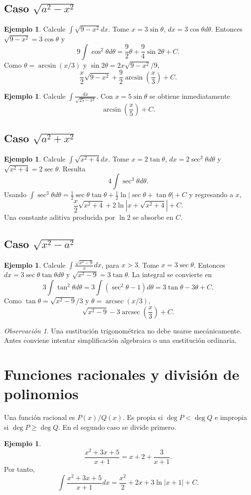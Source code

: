\documentclass[12pt]{article}
\theoremstyle{definition}\newtheorem{definicion}[teorema]{Definición}\newtheorem{ejemplo}[teorema]{Ejemplo}\newtheorem{ejercicio}[teorema]{Ejercicio}
\theoremstyle{remark}\newtheorem*{observacion}{Observación}\newtheorem*{advertencia}{Advertencia}\newtheorem*{estrategia}{Estrategia}
\begin{document}
\subsection{Caso $\sqrt{a^2-x^2}$}
\begin{ejemplo}Calcule $\int\sqrt{9-x^2}dx$. Tome $x=3\sin\theta$, $dx=3\cos\theta d\theta$. Entonces $\sqrt{9-x^2}=3\cos\theta$ y
\[9\int\cos^2\theta d\theta=\frac92\theta+\frac94\sin2\theta+C.\]
Como $\theta=\arcsin(x/3)$ y $\sin2\theta=2x\sqrt{9-x^2}/9$,
\[\boxed{\frac{x}{2}\sqrt{9-x^2}+\frac92\arcsin\left(\frac{x}{3}\right)+C}.\]\end{ejemplo}
\begin{ejemplo}Calcule $\int\frac{dx}{\sqrt{25-x^2}}$. Con $x=5\sin\theta$ se obtiene inmediatamente
\[\boxed{\arcsin\left(\frac{x}{5}\right)+C}.\]\end{ejemplo}
\subsection{Caso $\sqrt{a^2+x^2}$}
\begin{ejemplo}Calcule $\int\sqrt{x^2+4}dx$. Tome $x=2\tan\theta$, $dx=2\sec^2\theta d\theta$ y $\sqrt{x^2+4}=2\sec\theta$. Resulta
\[4\int\sec^3\theta d\theta.\]
Usando $\int\sec^3\theta d\theta=\frac12\sec\theta\tan\theta+\frac12\ln|\sec\theta+\tan\theta|+C$ y regresando a $x$,
\[\boxed{\frac{x}{2}\sqrt{x^2+4}+2\ln|x+\sqrt{x^2+4}|+C}.\]
Una constante aditiva producida por $\ln2$ se absorbe en $C$.\end{ejemplo}
\subsection{Caso $\sqrt{x^2-a^2}$}
\begin{ejemplo}Calcule $\int\frac{\sqrt{x^2-9}}{x}dx$, para $x>3$. Tome $x=3\sec\theta$. Entonces $dx=3\sec\theta\tan\theta d\theta$ y $\sqrt{x^2-9}=3\tan\theta$. La integral se convierte en
\[3\int\tan^2\theta d\theta=3\int(\sec^2\theta-1)d\theta=3\tan\theta-3\theta+C.\]
Como $\tan\theta=\sqrt{x^2-9}/3$ y $\theta=\operatorname{arcsec}(x/3)$,
\[\boxed{\sqrt{x^2-9}-3\operatorname{arcsec}\left(\frac{x}{3}\right)+C}.\]\end{ejemplo}
\begin{observacion}Una sustitución trigonométrica no debe usarse mecánicamente. Antes conviene intentar simplificación algebraica o una sustitución ordinaria.\end{observacion}

\section{Funciones racionales y división de polinomios}
Una función racional es $P(x)/Q(x)$. Es propia si $\deg P<\deg Q$ e impropia si $\deg P\ge\deg Q$. En el segundo caso se divide primero.
\begin{ejemplo}
\[\frac{x^2+3x+5}{x+1}=x+2+\frac3{x+1}.\]
Por tanto,
\[\boxed{\int\frac{x^2+3x+5}{x+1}dx=\frac{x^2}{2}+2x+3\ln|x+1|+C}.\]
\end{ejemplo}
\end{document}
